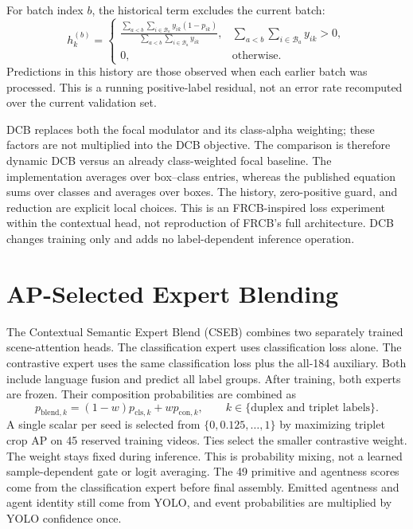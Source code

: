 For batch index \(b\), the historical term excludes the current batch:
\begin{equation}\label{eq:dcb-history}
 h_k^{(b)}=\begin{cases}
 \displaystyle\frac{\sum_{a<b}\sum_{i\in\mathcal B_a}y_{ik}(1-p_{ik})}
 {\sum_{a<b}\sum_{i\in\mathcal B_a}y_{ik}}, & \displaystyle\sum_{a<b}\sum_{i\in\mathcal B_a}y_{ik}>0,\\[6pt]
 0, & \text{otherwise}.
 \end{cases}
\end{equation}
Predictions in this history are those observed when each earlier batch was processed. This is a running positive-label residual, not an error rate recomputed over the current validation set.

DCB replaces both the focal modulator and its class-alpha weighting; these factors are not multiplied into the DCB objective. The comparison is therefore dynamic DCB versus an already class-weighted focal baseline. The implementation averages over box--class entries, whereas the published equation sums over classes and averages over boxes. The history, zero-positive guard, and reduction are explicit local choices. This is an FRCB-inspired loss experiment within the contextual head, not reproduction of FRCB's full architecture. DCB changes training only and adds no label-dependent inference operation.

\section{AP-Selected Expert Blending}

The Contextual Semantic Expert Blend (CSEB) combines two separately trained scene-attention heads. The classification expert uses classification loss alone. The contrastive expert uses the same classification loss plus the all-184 auxiliary. Both include language fusion and predict all label groups. After training, both experts are frozen. Their composition probabilities are combined as
\begin{equation}\label{eq:blend}
 p_{\mathrm{blend},k}=(1-w)p_{\mathrm{cls},k}+wp_{\mathrm{con},k},
 \qquad k\in\{\text{duplex and triplet labels}\}.
\end{equation}
A single scalar per seed is selected from \(\{0,0.125,\ldots,1\}\) by maximizing triplet crop AP on 45 reserved training videos. Ties select the smaller contrastive weight. The weight stays fixed during inference. This is probability mixing, not a learned sample-dependent gate or logit averaging. The 49 primitive and agentness scores come from the classification expert before final assembly. Emitted agentness and agent identity still come from YOLO, and event probabilities are multiplied by YOLO confidence once.


